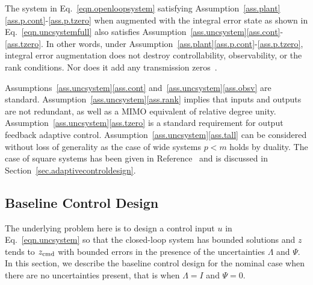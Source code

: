 \documentclass[]{../sty/JGCD}
\theoremstyle{examplestyle}
\begin{document}
  \begin{rem-dan}
    The system in Eq.\ \eqref{eqn.openloopsystem} satisfying Assumption~\ref{ass.plant}\ref{ass.p.cont}-\ref{ass.p.tzero} when augmented with the integral error state as shown in Eq.\ \eqref{eqn.uncsystemfull} also satisfies Assumption~\ref{ass.uncsystem}\ref{ass.cont}-\ref{ass.tzero}.
    In other words, under Assumption~\ref{ass.plant}\ref{ass.p.cont}-\ref{ass.p.tzero}, integral error augmentation does not destroy controllability, observability, or the rank conditions.
    Nor does it add any transmission zeros\ \cite{lavretsky.output.2010}.
  \end{rem-dan}

  \begin{rem-dan}
    Assumptions~\ref{ass.uncsystem}\ref{ass.cont} and~\ref{ass.uncsystem}\ref{ass.obsv} are standard. Assumption~\ref{ass.uncsystem}\ref{ass.rank} implies that inputs and outputs are not redundant, as well as a MIMO equivalent of relative degree unity.
    Assumption~\ref{ass.uncsystem}\ref{ass.tzero} is a standard requirement for output feedback adaptive control.
    Assumption~\ref{ass.uncsystem}\ref{ass.tall} can be considered without loss of generality as the case of wide systems $p<m$ holds by duality.
    The case of square systems has been given in Reference\ \cite{huang.designspr.1999} and is discussed in Section~\ref{sec.adaptivecontroldesign}.
  \end{rem-dan}

  \subsection{Baseline Control Design}

  The underlying problem here is to design a control input $u$ in Eq.\ \eqref{eqn.uncsystem} so that the closed-loop system has bounded solutions and $z$ tends to  $z_{{\rm cmd}}$ with bounded errors in the presence of the uncertainties $\Lambda$ and $\Psi$.
  In this section, we describe the baseline control design for the nominal case when there are no uncertainties present, that is when $\Lambda=I$ and $\Psi=0$.
\end{document}
